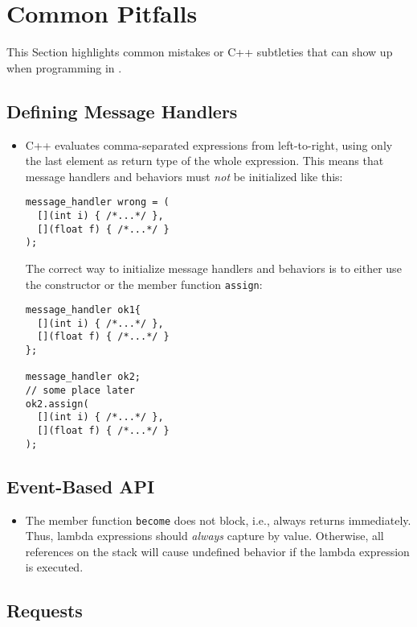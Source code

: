 \section{Common Pitfalls}
\label{pitfalls}

This Section highlights common mistakes or C++ subtleties that can show up when programming in \lib.

\subsection{Defining Message Handlers}

\begin{itemize}
\item C++ evaluates comma-separated expressions from left-to-right, using only the last element as return type of the whole expression. This means that message handlers and behaviors must \emph{not} be initialized like this:
\begin{lstlisting}
message_handler wrong = (
  [](int i) { /*...*/ },
  [](float f) { /*...*/ }
);
\end{lstlisting}
The correct way to initialize message handlers and behaviors is to either use the constructor or the member function \lstinline^assign^:
\begin{lstlisting}
message_handler ok1{
  [](int i) { /*...*/ },
  [](float f) { /*...*/ }
};

message_handler ok2;
// some place later
ok2.assign(
  [](int i) { /*...*/ },
  [](float f) { /*...*/ }
);
\end{lstlisting}
\end{itemize}

\subsection{Event-Based API}

\begin{itemize}
\item The member function \lstinline^become^ does not block, i.e., always returns immediately.
Thus, lambda expressions should \textit{always} capture by value. Otherwise, all references on the stack will cause undefined behavior if the lambda expression is executed.
\end{itemize}

\subsection{Requests}

